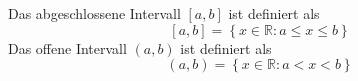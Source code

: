Das abgeschlossene Intervall $[a,b]$ ist definiert als
$$[a, b] = \left\{ x \in \mathbb{R} : a \leq x \leq b \right\}$$ 
Das offene Intervall $(a,b)$ ist definiert als
$$(a, b) = \left\{ x \in \mathbb{R} : a < x < b \right\}$$ 
